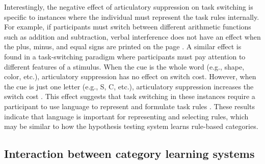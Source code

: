 \documentclass[../dissertation.tex]{subfiles}
\begin{document}
	Interestingly, the negative effect of articulatory suppression on task switching is specific to instances where the individual must represent the task rules internally. For example, if participants must switch between different arithmetic functions such as addition and subtraction, verbal interference does not have an effect when the plus, minus, and equal signs are printed on the page \citet{Baddeley2001}. A similar effect is found in a task-switching paradigm where participants must pay attention to different features of a stimulus. When the cue is the whole word (e.g., shape, color, etc.), articulatory suppression has no effect on switch cost. However, when the cue is just one letter (e.g., S, C, etc.), articulatory suppression increases the switch cost \citep{Miyake2004}. This effect suggests that task switching in these instances require a participant to use language to represent and formulate task rules \citep{Cragg2010}. These results indicate that language is important for representing and selecting rules, which may be similar to how the hypothesis testing system learns rule-based categories. 
	
\subsection{Interaction between category learning systems}
\end{document}
